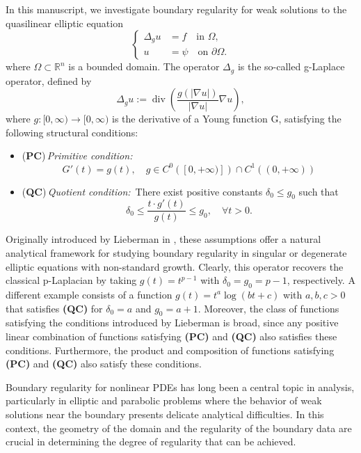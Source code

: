 \documentclass[11pt, leqno]{article}
\theoremstyle{definition}
\theoremstyle{remark}
\numberwithin{equation}{section}
\begin{document}
In this manuscript, we investigate boundary regularity for weak solutions to the quasilinear elliptic equation 
\begin{equation}\label{equ1}
    \left\{
    \begin{aligned}
        \Delta_g u &= f \quad \text{in } \Omega, \\
        u &= \psi \quad \text{on } \partial\Omega.
    \end{aligned}
    \right.
\end{equation}
where $\Omega\subset \mathbb{R}^n$ is a bounded domain.
The operator $\Delta_g$ is the so-called g-Laplace operator, defined by
$$\Delta_gu:=\operatorname{div}\left(\frac{g(|\nabla u|)}{|\nabla u|}\nabla u\right),$$
where $g:[0,\infty)\to [0,\infty)$ is the derivative of a Young function G, satisfying the following structural conditions:
\begin{itemize}
    \item {\rm (\textbf{PC})}\,\textit{Primitive condition:}
    $$G'(t)=g(t),\quad g\in C^0([0,+\infty)])\cap C^1((0,+\infty)) $$
    \item {\rm (\textbf{QC})}\,\textit{Quotient condition:}\, There exist positive constants $\delta_0\leq g_0$ such that
    $$ \delta_0\leq \frac{t\cdot g'(t)}{g(t)}\leq g_0,\quad\forall t>0. $$
\end{itemize}
Originally introduced by Lieberman in \cite{Lieb}, these assumptions offer a natural analytical framework for studying boundary regularity in singular or degenerate elliptic equations with non-standard growth. Clearly, this operator recovers the classical p-Laplacian by taking $g(t)=t^{p-1}$ with $\delta_{0}=g_{0}=p-1$, respectively. A different example consists of a function $g(t)=t^a\log(bt +c)$ with $a, b,c>0$ that satisfies {\bf (QC)} for $\delta_0=a$ and $g_0=a+1.$
Moreover, the class of functions satisfying the conditions introduced by Lieberman is broad, since any positive linear combination of functions satisfying \textbf{(PC)} and \textbf{(QC)} also satisfies these conditions. Furthermore, the product and composition of functions satisfying \textbf{(PC)} and \textbf{(QC)} also satisfy these conditions.

Boundary regularity for nonlinear PDEs has long been a central topic in analysis, particularly in elliptic and parabolic problems where the behavior of weak solutions near the boundary presents delicate analytical difficulties. In this context, the geometry of the domain and the regularity of the boundary data are crucial in determining the degree of regularity that can be achieved.
\end{document}
